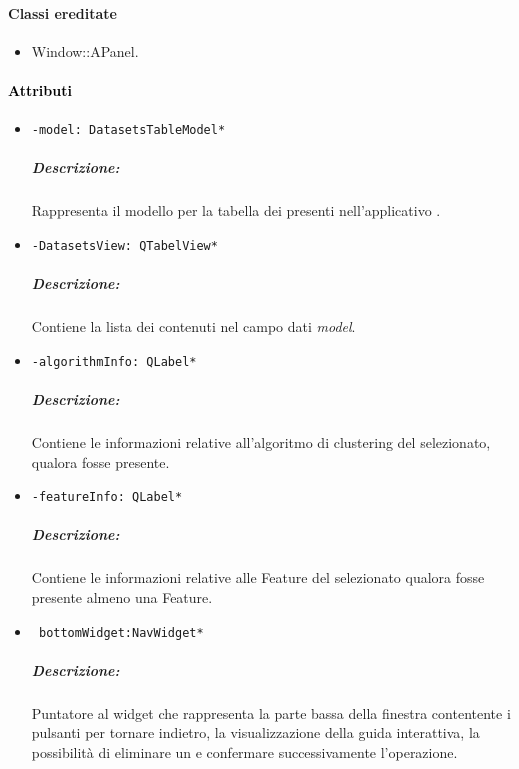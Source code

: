 \paragraph{Classi ereditate\\}
\begin{itemize}
\item Window::APanel.
\end{itemize}
\paragraph{\textcolor{black}{Attributi\\}}
\begin{itemize}
\item\color{teal}\verb!-model: DatasetsTableModel*!
\color{black}
\subparagraph{Descrizione: }
Rappresenta il modello per la tabella dei \dataset{} presenti nell'applicativo \project.
\item\color{teal}\verb!-DatasetsView: QTabelView*!
\color{black}
\subparagraph{Descrizione: }
Contiene la lista dei \dataset{} contenuti nel campo dati \emph{model}.

\item\color{teal}\verb!-algorithmInfo: QLabel*!
\color{black}
\subparagraph{Descrizione: }
Contiene le informazioni relative all'algoritmo di clustering\g{} del \protocol{} selezionato, qualora fosse presente.

\item\color{teal}\verb!-featureInfo: QLabel*!
\color{black}
\subparagraph{Descrizione: }
Contiene le informazioni relative alle Feature\g{} del \protocol{} selezionato qualora fosse presente almeno una Feature\g{}.

\item\color{teal}\verb! bottomWidget:NavWidget*!
\color{black} 
\subparagraph{Descrizione: }
Puntatore al widget che rappresenta la parte bassa della finestra contentente i pulsanti per tornare indietro, la visualizzazione della guida interattiva, la possibilità di eliminare un \dataset{} e confermare successivamente l'operazione.
\end{itemize}

